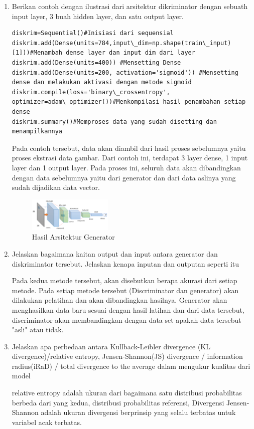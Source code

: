 \begin{enumerate}
            \item Berikan contoh dengan ilustrasi dari arsitektur dikriminator dengan sebuath input layer, 3 buah hidden layer, dan satu output layer.
\begin{verbatim}
diskrim=Sequential()#Inisiasi dari sequensial
diskrim.add(Dense(units=784,input\_dim=np.shape(train\_input)[1]))#Menambah dense layer dan input dim dari layer
diskrim.add(Dense(units=400)) #Mensetting Dense
diskrim.add(Dense(units=200, activation='sigmoid')) #Mensetting dense dan melakukan aktivasi dengan metode sigmoid
diskrim.compile(loss='binary\_crossentropy', optimizer=adam\_optimizer())#Menkompilasi hasil penambahan setiap dense
diskrim.summary()#Memproses data yang sudah disetting dan menampilkannya
\end{verbatim}
            \par Pada contoh tersebut, data akan diambil dari hasil proses sebelumnya yaitu proses ekstrasi data gambar. Dari contoh ini, terdapat 3 layer dense, 1 input layer dan 1 output layer. Pada proses ini, seluruh data akan dibandingkan dengan data sebelumnya yaitu dari generator dan dari data aslinya yang sudah dijadikan data vector. 
            \begin{figure}[H]
                \includegraphics[width=4cm]{figures/1174095/chapter8/teori10.PNG}
                \centering
                  \caption{Hasil Arsitektur Generator}
            \end{figure}
            
            \item Jelaskan bagaimana kaitan output dan input antara generator dan diskriminator tersebut. Jelaskan kenapa inputan dan outputan seperti itu
            \par Pada kedua metode tersebut, akan disebutkan berapa akurasi dari setiap metode. Pada setiap metode tersebut (Discriminator dan generator) akan dilakukan pelatihan dan akan dibandingkan hasilnya. Generator akan menghasilkan data baru sesuai dengan hasil latihan dan dari data tersebut, discriminator akan membandingkan dengan data set apakah data tersebut "asli" atau tidak.
            
            \item Jelaskan apa perbedaan antara Kullback-Leibler divergence (KL divergence)/relative entropy, Jensen-Shannon(JS) divergence / information radius(iRaD) / total divergence to the average dalam mengukur kualitas dari model
            \par relative entropy adalah ukuran dari bagaimana satu distribusi probabilitas berbeda dari yang kedua, distribusi probabilitas referensi, Divergensi Jensen-Shannon adalah ukuran divergensi berprinsip yang selalu terbatas untuk variabel acak terbatas.


\end{enumerate}
